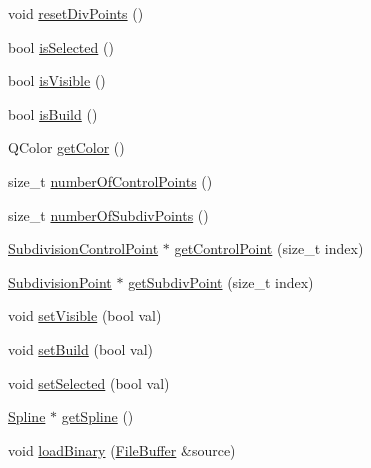 \begin{DoxyCompactItemize}
\item 
void \hyperlink{classShipCADGeometry_1_1SubdivisionControlCurve_a34e280e9ba6e6705577d1afd229e9f20}{reset\-Div\-Points} ()
\item 
bool \hyperlink{classShipCADGeometry_1_1SubdivisionControlCurve_a8b3c57aba1c16b77b902daacd7b88d0c}{is\-Selected} ()
\item 
bool \hyperlink{classShipCADGeometry_1_1SubdivisionControlCurve_a36bcf74cf20d7f1ae888f25f774b040d}{is\-Visible} ()
\item 
bool \hyperlink{classShipCADGeometry_1_1SubdivisionControlCurve_a16750d28e492cadbb3dd0f1ad303512e}{is\-Build} ()
\item 
Q\-Color \hyperlink{classShipCADGeometry_1_1SubdivisionControlCurve_a1dd7d33fd574c3cfdd53ccbb13abb695}{get\-Color} ()
\item 
size\-\_\-t \hyperlink{classShipCADGeometry_1_1SubdivisionControlCurve_a28c99c59aa80008a27cec27e8aada56b}{number\-Of\-Control\-Points} ()
\item 
size\-\_\-t \hyperlink{classShipCADGeometry_1_1SubdivisionControlCurve_a98ca6b2a39a99d0cee63263df65c6c1e}{number\-Of\-Subdiv\-Points} ()
\item 
\hyperlink{classShipCADGeometry_1_1SubdivisionControlPoint}{Subdivision\-Control\-Point} $\ast$ \hyperlink{classShipCADGeometry_1_1SubdivisionControlCurve_a0331fade870dd4856c070e2f487882b5}{get\-Control\-Point} (size\-\_\-t index)
\item 
\hyperlink{classShipCADGeometry_1_1SubdivisionPoint}{Subdivision\-Point} $\ast$ \hyperlink{classShipCADGeometry_1_1SubdivisionControlCurve_a52b12b58d524baba317ab6504e80018f}{get\-Subdiv\-Point} (size\-\_\-t index)
\item 
void \hyperlink{classShipCADGeometry_1_1SubdivisionControlCurve_a585a51955a6e91642b01d474eeef0d4f}{set\-Visible} (bool val)
\item 
void \hyperlink{classShipCADGeometry_1_1SubdivisionControlCurve_a698e6153097398da8fe2c6ecf2f2408b}{set\-Build} (bool val)
\item 
void \hyperlink{classShipCADGeometry_1_1SubdivisionControlCurve_abaf7f7cfec21eedacf55b1654f3e7f2f}{set\-Selected} (bool val)
\item 
\hyperlink{classShipCADGeometry_1_1Spline}{Spline} $\ast$ \hyperlink{classShipCADGeometry_1_1SubdivisionControlCurve_a6c62247f84c62bded5c291c54623f0f6}{get\-Spline} ()
\item 
void \hyperlink{classShipCADGeometry_1_1SubdivisionControlCurve_ad2a7118ea074ce1b7f61586f08039d2a}{load\-Binary} (\hyperlink{classShipCADGeometry_1_1FileBuffer}{File\-Buffer} \&source)

\end{DoxyCompactItemize}
